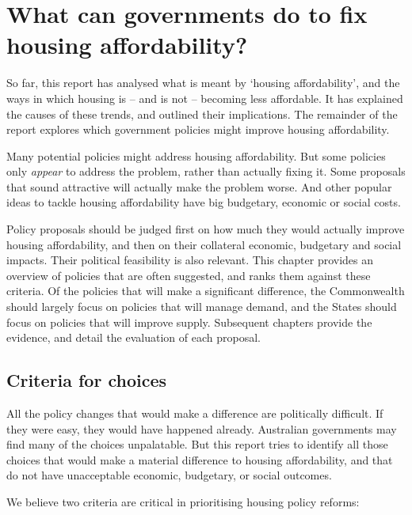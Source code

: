 \chapter{What can governments do to fix housing affordability?}\label{chap:what-can-governments-do-to-fix-housing-affordability}

So far, this report has analysed what is meant by `housing affordability', and the ways in which housing is -- and is not -- becoming less affordable.
It has explained the causes of these trends, and outlined their implications.
The remainder of the report explores which government policies might improve housing affordability.

Many potential policies might address housing affordability.
But some policies only \emph{appear} to address the problem, rather than actually fixing it.
Some proposals that sound attractive will actually make the problem worse.
And other popular ideas to tackle housing affordability have big budgetary, economic or social costs.

Policy proposals should be judged first on how much they would actually improve housing affordability, and then on their collateral economic, budgetary and social impacts.
Their political feasibility is also relevant.
This chapter provides an overview of policies that are often suggested, and ranks them against these criteria.
Of the policies that will make a significant difference, the Commonwealth should largely focus on policies that will manage demand, and the States should focus on policies that will improve supply.
Subsequent chapters provide the evidence, and detail the evaluation of each proposal.

\section{Criteria for choices}\label{sec:criteria-for-choices}

All the policy changes that would make a difference are politically difficult.
If they were easy, they would have happened already.
Australian governments may find many of the choices unpalatable.
But this report tries to identify all those choices that would make a material difference to housing affordability, and that do not have unacceptable economic, budgetary, or social outcomes.

We believe two criteria are critical in prioritising housing policy reforms:

